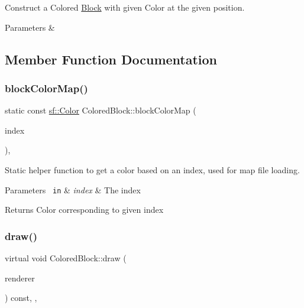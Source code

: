 Construct a Colored \mbox{\hyperlink{class_block}{Block}} with given Color at the given position. 


\begin{DoxyParams}{Parameters}
{\em } & \\
\hline
\end{DoxyParams}


\subsection{Member Function Documentation}
\mbox{\label{class_colored_block_a5d6dd29a50e87b370ebb66faf9d904b6}} 
\subsubsection{\texorpdfstring{blockColorMap()}{blockColorMap()}}
{\footnotesize\ttfamily static const \mbox{\hyperlink{classsf_1_1_color}{sf\+::\+Color}} Colored\+Block\+::block\+Color\+Map (\begin{DoxyParamCaption}\item[{int}]{index }\end{DoxyParamCaption})\hspace{0.3cm}{\ttfamily [inline]}, {\ttfamily [static]}}



Static helper function to get a color based on an index, used for map file loading. 


\begin{DoxyParams}[1]{Parameters}
\mbox{\texttt{ in}}  & {\em index} & The index\\
\hline
\end{DoxyParams}
\begin{DoxyReturn}{Returns}
Color corresponding to given index 
\end{DoxyReturn}
\mbox{\label{class_colored_block_a406ca632f6b5a45b8f88de0ba3ab9b43}} 
\subsubsection{\texorpdfstring{draw()}{draw()}}
{\footnotesize\ttfamily virtual void Colored\+Block\+::draw (\begin{DoxyParamCaption}\item[{\mbox{\hyperlink{classsf_1_1_render_target}{sf\+::\+Render\+Target}} \&}]{renderer }\end{DoxyParamCaption}) const\hspace{0.3cm}{\ttfamily [inline]}, {\ttfamily [override]}, {\ttfamily [virtual]}}



